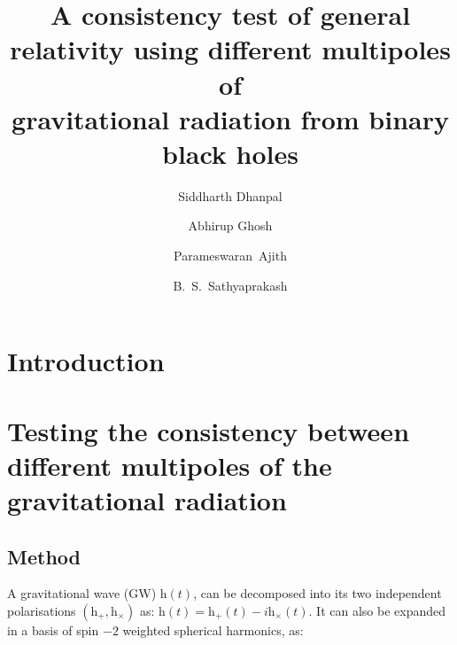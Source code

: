 \documentclass[prd,preprintnumbers,twocolumn,eqsecnum,floatfix,a4paper,nofootinbib,superscriptaddress]{revtex4}
\begin{document}
\newcommand{\be}{\begin{equation}}
\newcommand{\ee}{\end{equation}}
\newcommand{\ber}{\begin{eqnarray}}
\newcommand{\eer}{\end{eqnarray}}
\def\bea{\begin{eqnarray}}
\def\eea{\end{eqnarray}}
\newcommand{\etal}{\emph{et al}}

\title{A consistency test of general relativity using different multipoles of \\gravitational radiation from binary black holes}
\author{Siddharth Dhanpal}
\author{Abhirup Ghosh}
\author{Parameswaran~Ajith}
\author{B.~S.~Sathyaprakash}

\begin{abstract}
\end{abstract}
\maketitle
\section{Introduction}
\section{Testing the consistency between different multipoles of the gravitational radiation}
\subsection{Method}\label{ssec:Method}
A gravitational wave (GW) $\mathrm{h}(t)$, can be decomposed into its two independent polarisations $(\mathrm{h} _+,\mathrm{h} _{\times})$ as: $\mathrm{h}(t) = \mathrm{h} _+(t) - i \mathrm{h} _{\times}(t)$. It can also be expanded in a basis of spin $-2$ weighted spherical harmonics, as:
\end{document}
